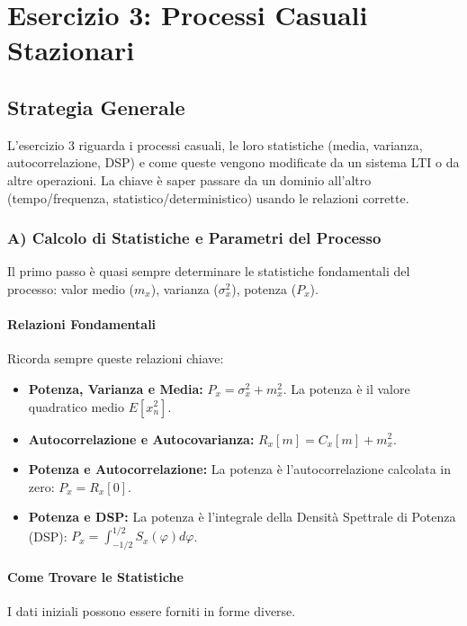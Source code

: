 \chapter{Esercizio 3: Processi Casuali Stazionari}

\section{Strategia Generale}
L'esercizio 3 riguarda i processi casuali, le loro statistiche (media, varianza, autocorrelazione, DSP) e come queste vengono modificate da un sistema LTI o da altre operazioni. La chiave è saper passare da un dominio all'altro (tempo/frequenza, statistico/deterministico) usando le relazioni corrette.

\subsection{A) Calcolo di Statistiche e Parametri del Processo}
Il primo passo è quasi sempre determinare le statistiche fondamentali del processo: valor medio ($m_x$), varianza ($\sigma_x^2$), potenza ($P_x$).

\subsubsection{Relazioni Fondamentali}
Ricorda sempre queste relazioni chiave:
\begin{itemize}
    \item \textbf{Potenza, Varianza e Media:} $P_x = \sigma_x^2 + m_x^2$. La potenza è il valore quadratico medio $E[x_n^2]$.
    \item \textbf{Autocorrelazione e Autocovarianza:} $R_x[m] = C_x[m] + m_x^2$.
    \item \textbf{Potenza e Autocorrelazione:} La potenza è l'autocorrelazione calcolata in zero: $P_x = R_x[0]$.
    \item \textbf{Potenza e DSP:} La potenza è l'integrale della Densità Spettrale di Potenza (DSP): $P_x = \int_{-1/2}^{1/2} S_x(\varphi) d\varphi$.
\end{itemize}

\subsubsection{Come Trovare le Statistiche}
I dati iniziali possono essere forniti in forme diverse.

